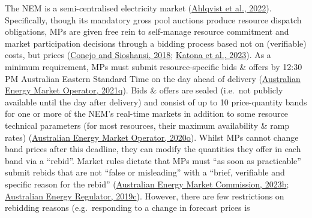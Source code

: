 \documentclass[12pt,a4paper,]{report}
\begin{document}
The NEM is a semi-centralised electricity market
(\protect\hyperlink{ref-ahlqvistSurveyComparingCentralized2022}{Ahlqvist
et al., 2022}). Specifically, though its mandatory gross pool auctions
produce resource dispatch obligations, MPs are given free rein to
self-manage resource commitment and market participation decisions
through a bidding process based not on (verifiable) costs, but prices
(\protect\hyperlink{ref-conejoRethinkingRestructuredElectricity2018}{Conejo
and Sioshansi, 2018};
\protect\hyperlink{ref-katonaPriceMechanismSurvey2023}{Katona et al.,
2023}). As a minimum requirement, MPs must submit resource-specific bids
\& offers by 12:30 PM Australian Eastern Standard Time on the day ahead
of delivery
(\protect\hyperlink{ref-australianenergymarketoperatorSpotMarketOperations2021}{Australian
Energy Market Operator, 2021q}). Bids \& offers are sealed (i.e.~not
publicly available until the day after delivery) and consist of up to 10
price-quantity bands for one or more of the NEM's real-time markets in
addition to some resource technical parameters (for most resources,
their maximum availability \& ramp rates)
(\protect\hyperlink{ref-australianenergymarketoperatorFormatValidationEnergy2020}{Australian
Energy Market Operator, 2020o}). Whilst MPs cannot change band prices
after this deadline, they can modify the quantities they offer in each
band via a ``rebid''. Market rules dictate that MPs must ``as soon as
practicable'' submit rebids that are not ``false or misleading'' with a
``brief, verifiable and specific reason for the rebid''
(\protect\hyperlink{ref-australianenergymarketcommissionNationalElectricityRules2023}{Australian
Energy Market Commission, 2023b};
\protect\hyperlink{ref-australianenergyregulatorRebiddingTechnicalParameters2019}{Australian
Energy Regulator, 2019c}). However, there are few restrictions on
rebidding reasons (e.g.~responding to a change in forecast prices is
\end{document}
